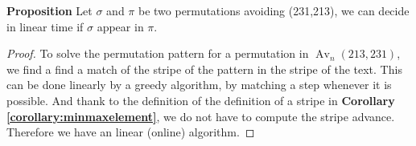 \documentclass[a4paper]{llncs}
\DeclareMathOperator{\AV}{Av}
\newcommand{\ptext}{\pi}
\newcommand{\pmotif}{\sigma}
\newcounter{num}
\newcommand{\num}{\stepcounter{num} }
\begin{document}
\textbf{Proposition  \num \thenum} Let $\pmotif$ and $\ptext$
be two permutations avoiding (231,213), 
we can decide in linear time if $\pmotif$ 
appear in $\ptext$.\\	

\begin{proof}
To solve the permutation pattern for a permutation in $\AV_n(213,231)$, 
we find a find a match of the stripe of the pattern in the stripe of the text.
This can be done linearly by a greedy algorithm, 
by matching a step whenever it is possible.
And thank to the definition of the definition of a stripe in \textbf{Corollary \ref{corollary:minmaxelement}},
we do not have to compute the stripe advance.
Therefore we have an linear (online) algorithm.
\end{proof}	

		
\end{document}
